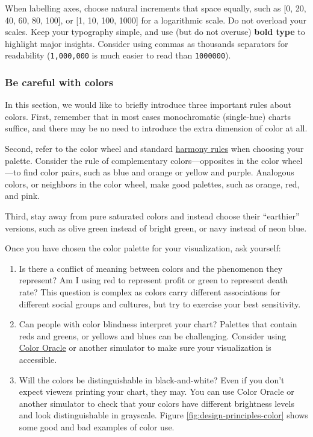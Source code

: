 \documentclass[
  english,
]{book}
\begin{document}
When labelling axes, choose natural increments that space equally, such as {[}0, 20, 40, 60, 80, 100{]}, or {[}1, 10, 100, 1000{]} for a logarithmic scale. Do not overload your scales.
Keep your typography simple, and use (but do not overuse) \textbf{bold type} to highlight major insights.
Consider using commas as thousands separators for readability (\texttt{1,000,000} is much easier to read than \texttt{1000000}).

\hypertarget{be-careful-with-colors}{%
\subsubsection*{Be careful with colors}\label{be-careful-with-colors}}

In this section, we would like to briefly introduce three important rules about colors. First, remember that in most cases monochromatic (single-hue) charts suffice, and there may be no need to introduce the extra dimension of color at all.

Second, refer to the color wheel and standard \href{https://en.wikipedia.org/wiki/Harmony_(color)}{harmony rules} when choosing your palette. Consider the rule of complementary colors---opposites in the color wheel---to find color pairs, such as blue and orange or yellow and purple. Analogous colors, or neighbors in the color wheel, make good palettes, such as orange, red, and pink.

Third, stay away from pure saturated colors and instead choose their ``earthier'' versions, such as olive green instead of bright green, or navy instead of neon blue.

Once you have chosen the color palette for your visualization, ask yourself:

\begin{enumerate}
\def\labelenumi{\arabic{enumi}.}
\item
  Is there a conflict of meaning between colors and the phenomenon they represent? Am I using red to represent profit or green to represent death rate? This question is complex as colors carry different associations for different social groups and cultures, but try to exercise your best sensitivity.
\item
  Can people with color blindness interpret your chart? Palettes that contain reds and greens, or yellows and blues can be challenging. Consider using \href{https://www.colororacle.org/}{Color Oracle} or another simulator to make sure your visualization is accessible.
\item
  Will the colors be distinguishable in black-and-white? Even if you don't expect viewers printing your chart, they may. You can use Color Oracle or another simulator to check that your colors have different brightness levels and look distinguishable in grayscale. Figure \ref{fig:design-principles-color} shows some good and bad examples of color use.
\end{enumerate}
\end{document}
